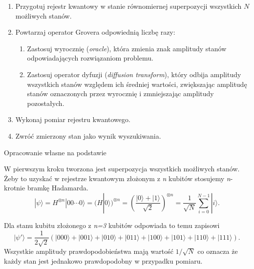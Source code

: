 \begin{algorithm}[H]
\caption{Algorytm Grovera}
\label{alg:grover}
\begin{enumerate}
    \item Przygotuj rejestr kwantowy w stanie równomiernej superpozycji
    wszystkich $N$ możliwych stanów.

    \item Powtarzaj operator Grovera odpowiednią liczbę razy:
    \begin{enumerate}
        \item Zastosuj wyrocznię (\textit{oracle}), która zmienia znak
        amplitudy stanów odpowiadających rozwiązaniom problemu.

        \item Zastosuj operator dyfuzji (\textit{diffusion transform}),
        który odbija amplitudy wszystkich stanów względem ich średniej
        wartości, zwiększając amplitudę stanów oznaczonych przez wyrocznię
        i zmniejszając amplitudy pozostałych.
    \end{enumerate}

    \item Wykonaj pomiar rejestru kwantowego.
    \item Zwróć zmierzony stan jako wynik wyszukiwania.
\end{enumerate}
\begin{center}
\small Opracowanie własne na podstawie \cite{grover1996}
\end{center}
\end{algorithm}

W pierwszym kroku tworzona jest superpozycja wszystkich możliwych stanów.  Żeby to uzyskać w rejestrze kwantowym złożonym z \textit{n} kubitów stosujemy \textit{n}-krotnie bramkę Hadamarda. 
\cite[s.~162, wz.~(4.66)]{inf_kwant}  
\begin{equation}
\label{eq:superposition}
|\psi\rangle
=
H^{\otimes n}|00\cdots0\rangle
=
(H|0\rangle)^{\otimes n}
=
\left(
\frac{|0\rangle+|1\rangle}{\sqrt2}
\right)^{\otimes n}
=
\frac1{\sqrt N}
\sum_{i=0}^{N-1}|i\rangle .
\end{equation}

\noindent
Dla stanu kubitu złożonego z \textit{n=3} kubitów odpowiada to temu zapisowi \cite[s.~278, wz.~(5.366)]{inf_kwant}  
\begin{equation}
\label{eq:superposition_example}
|\psi'\rangle = \frac1{2\sqrt2} ( |000\rangle+ |001\rangle+ |010\rangle+ |011\rangle+ |100\rangle+ |101\rangle+ |110\rangle+ |111\rangle ).
\end{equation}
\noindent
Wszystkie amplitudy prawdopodobieństwa mają wartość $1/\sqrt{N}$ co oznacza że każdy stan jest jednakowo prawdopodobny w przypadku pomiaru.

